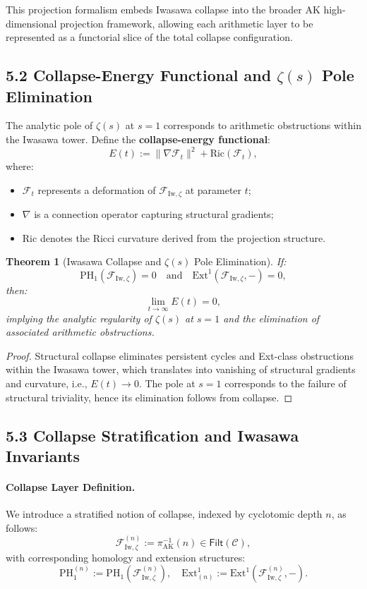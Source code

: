 \documentclass[11pt]{article}
\newtheorem{theorem}{Theorem}[section]
\begin{document}
This projection formalism embeds Iwasawa collapse into the broader AK high-dimensional projection framework, allowing each arithmetic layer to be represented as a functorial slice of the total collapse configuration.

\subsection*{5.2 Collapse-Energy Functional and $\zeta(s)$ Pole Elimination}

The analytic pole of $\zeta(s)$ at $s = 1$ corresponds to arithmetic obstructions within the Iwasawa tower. Define the \textbf{collapse-energy functional}:
\[
E(t) := \| \nabla \mathcal{F}_t \|^2 + \mathrm{Ric}(\mathcal{F}_t),
\]
where:
\begin{itemize}
    \item $\mathcal{F}_t$ represents a deformation of $\mathcal{F}_{\mathrm{Iw}, \zeta}$ at parameter $t$;
    \item $\nabla$ is a connection operator capturing structural gradients;
    \item $\mathrm{Ric}$ denotes the Ricci curvature derived from the projection structure.
\end{itemize}

\begin{theorem}[Iwasawa Collapse and $\zeta(s)$ Pole Elimination]
If:
\[
\mathrm{PH}_1(\mathcal{F}_{\mathrm{Iw}, \zeta}) = 0 \quad \text{and} \quad \mathrm{Ext}^1(\mathcal{F}_{\mathrm{Iw}, \zeta}, -) = 0,
\]
then:
\[
\lim_{t \to \infty} E(t) = 0,
\]
implying the analytic regularity of $\zeta(s)$ at $s = 1$ and the elimination of associated arithmetic obstructions.
\end{theorem}

\begin{proof}
Structural collapse eliminates persistent cycles and Ext-class obstructions within the Iwasawa tower, which translates into vanishing of structural gradients and curvature, i.e., $E(t) \to 0$. The pole at $s = 1$ corresponds to the failure of structural triviality, hence its elimination follows from collapse.
\end{proof}

\subsection*{5.3 Collapse Stratification and Iwasawa Invariants}

\paragraph{Collapse Layer Definition.}
We introduce a stratified notion of collapse, indexed by cyclotomic depth $n$, as follows:
\[
\mathcal{F}_{\mathrm{Iw}, \zeta}^{(n)} := \pi_{\mathrm{AK}}^{-1}(n) \in \mathsf{Filt}(\mathcal{C}),
\]
with corresponding homology and extension structures:
\[
\mathrm{PH}_1^{(n)} := \mathrm{PH}_1(\mathcal{F}_{\mathrm{Iw}, \zeta}^{(n)}), \quad \mathrm{Ext}^1_{(n)} := \mathrm{Ext}^1(\mathcal{F}_{\mathrm{Iw}, \zeta}^{(n)}, -).
\]
\end{document}
